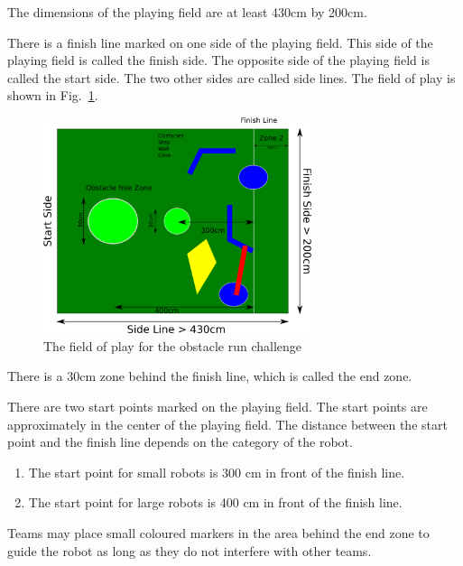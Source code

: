 \documentclass[12pt]{hurocup}
\begin{document}
\begin{lawlist}[OR]
\item The dimensions of the playing field are at least 430cm by
  200cm. 
\item There is a finish line marked on one side of the playing field.
  This side of the playing field is called the finish side. The
  opposite side of the playing field is called the start side. The two
  other sides are called side lines. The field of play is shown in
  Fig.~\ref{fig:obstacle-run}.  

  \begin{figure}
    \begin{center}
      \includegraphics[width=0.7\textwidth]{Figures/obstacle-run}
    \end{center}
    \caption{The field of play for the obstacle run challenge}
    \label{fig:obstacle-run}
  \end{figure}

\item There is a 30cm zone behind the finish line, which is called the
  end zone.
\item \label{or-start-points} There are two start points marked on
  the playing field. The start points are approximately in the center
  of the playing field. The distance between the start point and the
  finish line depends on the category of the robot.
  \begin{enumerate}
  \item The start point for small robots is 300 cm in front of the
    finish line. 
  \item The start point for large robots is 400 cm in front of the
    finish line. 
  \end{enumerate}
\item Teams may place small coloured markers in the area behind the
  end zone to guide the robot as long as they do not interfere with
  other teams.
\end{lawlist}
\end{document}
